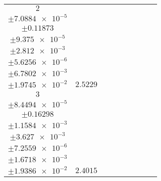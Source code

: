 \documentclass[8pt]{article}
\begin{document}
\begin{longtable}[l]{c c c c c c c c c}
$\num{2}$ & \begin{tabular}[c]{@{}c@{}}$\num{3.1299e-2}$ \\ $\pm\num{7.0884e-5}$\end{tabular} & \begin{tabular}[c]{@{}c@{}}$\num{-0.32622}$ \\ $\pm\num{0.11873}$\end{tabular} & \begin{tabular}[c]{@{}c@{}}$\num{-7.4872}$ \\ $\pm\num{9.375e-5}$\end{tabular} & \begin{tabular}[c]{@{}c@{}}$\num{1.8501e+3}$ \\ $\pm\num{2.812e-3}$\end{tabular} & \begin{tabular}[c]{@{}c@{}}$\num{3.7011}$ \\ $\pm\num{5.6256e-6}$\end{tabular} & \begin{tabular}[c]{@{}c@{}}$\num{1.1786}$ \\ $\pm\num{6.7802e-3}$\end{tabular} & \begin{tabular}[c]{@{}c@{}}$\num{4.0863}$ \\ $\pm\num{1.9745e-2}$\end{tabular} & $\num{2.5229}$\\
$\num{3}$ & \begin{tabular}[c]{@{}c@{}}$\num{2.8542e-2}$ \\ $\pm\num{8.4494e-5}$\end{tabular} & \begin{tabular}[c]{@{}c@{}}$\num{-0.31296}$ \\ $\pm\num{0.16298}$\end{tabular} & \begin{tabular}[c]{@{}c@{}}$\num{-7.3087}$ \\ $\pm\num{1.1584e-3}$\end{tabular} & \begin{tabular}[c]{@{}c@{}}$\num{1.8503e+3}$ \\ $\pm\num{3.627e-3}$\end{tabular} & \begin{tabular}[c]{@{}c@{}}$\num{3.7016}$ \\ $\pm\num{7.2559e-6}$\end{tabular} & \begin{tabular}[c]{@{}c@{}}$\num{1.1355}$ \\ $\pm\num{1.6718e-3}$\end{tabular} & \begin{tabular}[c]{@{}c@{}}$\num{4.1412}$ \\ $\pm\num{1.9386e-2}$\end{tabular} & $\num{2.4015}$\\

\end{longtable}
\end{document}
